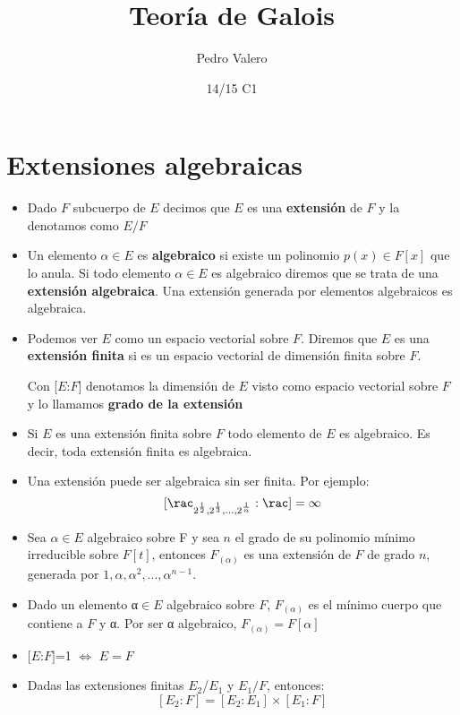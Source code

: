 \documentclass[nochap]{apuntes}
\title{Teoría de Galois}
\author{Pedro Valero}
\date{14/15 C1}
\begin{document}
\pagestyle{plain}
\maketitle

\tableofcontents
\newpage

\section{Extensiones algebraicas}
\begin{itemize}
\item Dado $F$ subcuerpo de $E$ decimos que $E$ es una \textbf{extensión} de $F$ y la denotamos como $E/F$

\item Un elemento $α\in E$ es \textbf{algebraico} si existe un polinomio $p(x) \in F[x]$ que lo anula. Si todo elemento $α \in E$ es algebraico diremos que se trata de una \textbf{extensión algebraica}. Una extensión generada por elementos algebraicos es algebraica.

\item Podemos ver $E$ como un espacio vectorial sobre $F$. Diremos que $E$ es una \textbf{extensión finita} si es un espacio vectorial de dimensión finita sobre $F$. 

Con [$E$:$F$] denotamos la dimensión de $E$ visto como espacio vectorial sobre $F$ y lo llamamos \textbf{grado de la extensión}

\item Si $E$ es una extensión finita sobre $F$ todo elemento de $E$ es algebraico. Es decir, toda extensión finita es algebraica.

\item Una extensión puede ser algebraica sin ser finita. Por ejemplo: 
\[[\rac_{2^{\frac{1}{2}}, 2^{\frac{1}{3}}, ..., 2^{\frac{1}{n}}}:\rac] = \infty\]

\item Sea $α\in E$ algebraico sobre F y sea $n$ el grado de su polinomio mínimo irreducible sobre $F[t]$, entonces $F_{(α)}$ es una extensión de $F$ de grado $n$, generada por $1, α, α^2, ..., α^{n-1}$.

\item Dado un elemento α$\in E$ algebraico sobre $F$, $F_{(α)}$ es el mínimo cuerpo que contiene a $F$ y α. Por ser α algebraico, $F_{(α)}=F[α]$

\item $[E$:$F]$=1 $\iff$ $E=F$

\item Dadas las extensiones finitas $E_2$/$E_1$ y $E_1/F$, entonces:
\[[E_2:F]=[E_2:E_1]\times [E_1:F]\]


\end{itemize}
\end{document}
